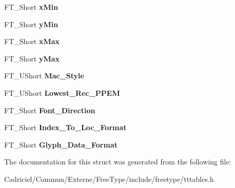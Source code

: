 \begin{DoxyCompactItemize}
\item 
F\+T\+\_\+\+Short {\bfseries x\+Min}\hypertarget{struct_t_t___header___ae4553d76427d9f7a28595ed71897dcbb}{}\label{struct_t_t___header___ae4553d76427d9f7a28595ed71897dcbb}

\item 
F\+T\+\_\+\+Short {\bfseries y\+Min}\hypertarget{struct_t_t___header___ac6aad4966bac8a96c5bc48765b3d694a}{}\label{struct_t_t___header___ac6aad4966bac8a96c5bc48765b3d694a}

\item 
F\+T\+\_\+\+Short {\bfseries x\+Max}\hypertarget{struct_t_t___header___a593b9cc3e11532972a7fc96944dd1ae9}{}\label{struct_t_t___header___a593b9cc3e11532972a7fc96944dd1ae9}

\item 
F\+T\+\_\+\+Short {\bfseries y\+Max}\hypertarget{struct_t_t___header___a02d236cd8150c00e886a0c487c04dffa}{}\label{struct_t_t___header___a02d236cd8150c00e886a0c487c04dffa}

\item 
F\+T\+\_\+\+U\+Short {\bfseries Mac\+\_\+\+Style}\hypertarget{struct_t_t___header___a82f2a5a836b802e44ff712b3afc8745c}{}\label{struct_t_t___header___a82f2a5a836b802e44ff712b3afc8745c}

\item 
F\+T\+\_\+\+U\+Short {\bfseries Lowest\+\_\+\+Rec\+\_\+\+P\+P\+EM}\hypertarget{struct_t_t___header___a1d20801c3482dee2529d294441ed9af3}{}\label{struct_t_t___header___a1d20801c3482dee2529d294441ed9af3}

\item 
F\+T\+\_\+\+Short {\bfseries Font\+\_\+\+Direction}\hypertarget{struct_t_t___header___a1cb7d8a2a76ae1acda3ac94bcd555954}{}\label{struct_t_t___header___a1cb7d8a2a76ae1acda3ac94bcd555954}

\item 
F\+T\+\_\+\+Short {\bfseries Index\+\_\+\+To\+\_\+\+Loc\+\_\+\+Format}\hypertarget{struct_t_t___header___a05a488607bfae319de096b4bd9cf8c6d}{}\label{struct_t_t___header___a05a488607bfae319de096b4bd9cf8c6d}

\item 
F\+T\+\_\+\+Short {\bfseries Glyph\+\_\+\+Data\+\_\+\+Format}\hypertarget{struct_t_t___header___adeeedce4bb708c3e068ed80366ec921d}{}\label{struct_t_t___header___adeeedce4bb708c3e068ed80366ec921d}

\end{DoxyCompactItemize}


The documentation for this struct was generated from the following file\+:\begin{DoxyCompactItemize}
\item 
Cadriciel/\+Commun/\+Externe/\+Free\+Type/include/freetype/tttables.\+h\end{DoxyCompactItemize}
